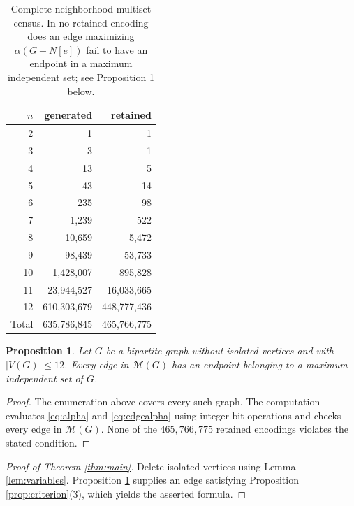 \documentclass[11pt]{amsart}
\newtheorem{proposition}[theorem]{Proposition}
\newcommand{\M}{\mathcal M}
\begin{document}
\begin{table}[ht]
\centering
\small
\caption{Complete neighborhood-multiset census. In no retained encoding does an
edge maximizing $\alpha(G-N[e])$ fail to have an endpoint in a maximum
independent set; see Proposition \ref{prop:finite} below.}
\label{tab:census}
\begin{tabular}{r@{\qquad}r@{\qquad}r}
\toprule
$n$ & generated & retained \\
\midrule
 2 &           1 &           1 \\
 3 &           3 &           1 \\
 4 &          13 &           5 \\
 5 &          43 &          14 \\
 6 &         235 &          98 \\
 7 &       1{,}239 &         522 \\
 8 &      10{,}659 &       5{,}472 \\
 9 &      98{,}439 &      53{,}733 \\
10 &   1{,}428{,}007 &     895{,}828 \\
11 &  23{,}944{,}527 &  16{,}033{,}665 \\
12 & 610{,}303{,}679 & 448{,}777{,}436 \\
\midrule
Total & 635{,}786{,}845 & 465{,}766{,}775 \\
\bottomrule
\end{tabular}
\end{table}

\begin{proposition}\label{prop:finite}
Let $G$ be a bipartite graph without isolated vertices and with
$|V(G)|\leq12$. Every edge in $\M(G)$ has an endpoint belonging to a maximum
independent set of $G$.
\end{proposition}

\begin{proof}
The enumeration above covers every such graph. The computation evaluates
\eqref{eq:alpha} and \eqref{eq:edgealpha} using integer bit operations and checks
every edge in $\M(G)$. None of the $465{,}766{,}775$ retained encodings violates
the stated condition.
\end{proof}

\begin{proof}[Proof of Theorem \ref{thm:main}]
Delete isolated vertices using Lemma \ref{lem:variables}. Proposition
\ref{prop:finite} supplies an edge satisfying Proposition
\ref{prop:criterion}(3), which yields the asserted formula.
\end{proof}
\end{document}
